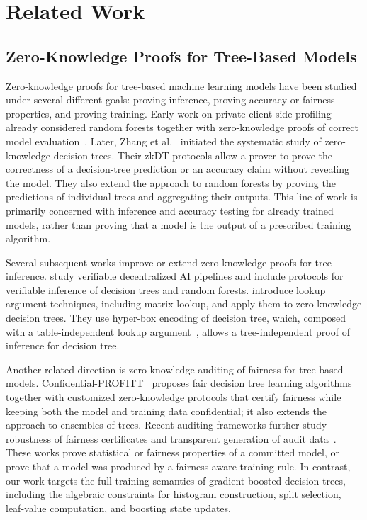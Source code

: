 \section{Related Work}\label{sec:related}
\subsection{Zero-Knowledge Proofs for Tree-Based Models}
\label{subsec:related-zk-tree}

Zero-knowledge proofs for tree-based machine learning models have been studied
under several different goals: proving inference, proving accuracy or fairness
properties, and proving training. Early work on private client-side profiling
already considered random forests together with zero-knowledge proofs of correct
model evaluation~\cite{danezis2012private}. Later, Zhang et al.~\cite{zkdt20}
initiated the systematic study of zero-knowledge decision trees. Their zkDT
protocols allow a prover to prove the correctness of a decision-tree prediction
or an accuracy claim without revealing the model. They also extend the approach
to random forests by proving the predictions of individual trees and aggregating
their outputs. This line of work is primarily concerned with inference and
accuracy testing for already trained models, rather than proving that a model is
the output of a prescribed training algorithm.

Several subsequent works improve or extend zero-knowledge proofs for tree
inference. \citet{verifiable-ai22} study verifiable
decentralized AI pipelines and include protocols for verifiable inference of
decision trees and random forests. \citet{cq++24} introduce
lookup argument techniques, including matrix lookup, and apply them to
zero-knowledge decision trees.
They use hyper-box encoding of decision tree,
which, composed with a table-independent lookup argument~\cite{cq22, cq++24},
allows a tree-independent proof of inference for decision tree.

Another related direction is zero-knowledge auditing of fairness for tree-based
models. Confidential-PROFITT~\cite{confidential-profitt22} proposes fair decision
tree learning algorithms together with customized zero-knowledge protocols that
certify fairness while keeping both the model and training data confidential; it
also extends the approach to ensembles of trees. Recent auditing frameworks
further study robustness of fairness certificates and transparent generation of
audit data~\cite{audifair26}. These works prove statistical or fairness properties
of a committed model, or prove that a model was produced by a fairness-aware
training rule. In contrast, our work targets the full training semantics of
gradient-boosted decision trees, including the algebraic constraints for
histogram construction, split selection, leaf-value computation, and boosting
state updates.

